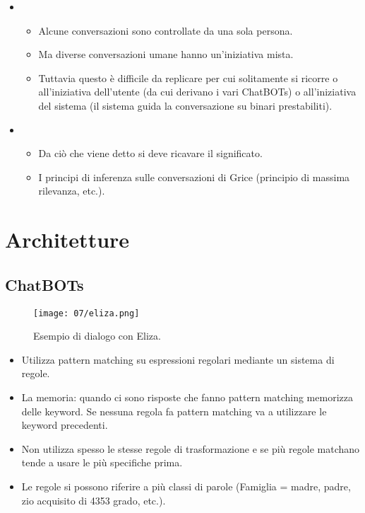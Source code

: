 \begin{itemize}
\begin{itemize}
    \end{itemize}
  \item {}
    \begin{itemize}
      \item Alcune conversazioni sono controllate da una sola persona. 
      \item Ma diverse conversazioni umane hanno un'iniziativa mista. 
      \item Tuttavia questo è difficile da replicare per cui solitamente si ricorre o all'iniziativa dell'utente (da cui derivano i vari ChatBOTs) o all'iniziativa del sistema (il sistema guida la conversazione su binari prestabiliti). 
    \end{itemize}
  \item {}
    \begin{itemize}
      \item Da ciò che viene detto si deve ricavare il significato. 
      \item I principi di inferenza sulle conversazioni di Grice (principio di massima rilevanza, etc.).
    \end{itemize}
\end{itemize}

\section{Architetture}

\subsection{ChatBOTs}




\begin{figure}[h]
    \centering
    \texttt{[image: 07/eliza.png]}
    \caption{Esempio di dialogo con Eliza.}
\end{figure}


\begin{itemize}
  \item Utilizza pattern matching su espressioni regolari mediante un sistema di regole. 
  \item La memoria: quando ci sono risposte che fanno pattern matching memorizza delle keyword. Se nessuna regola fa pattern matching va a utilizzare le keyword precedenti. 
  \item Non utilizza spesso le stesse regole di trasformazione e se più regole matchano tende a usare le più specifiche prima. 
  \item Le regole si possono riferire a più classi di parole (Famiglia = madre, padre, zio acquisito di 4353 grado, etc.). 
\end{itemize}

